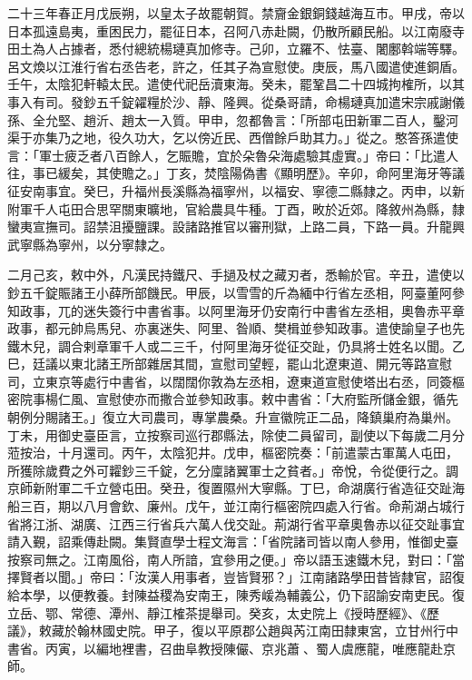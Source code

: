 
\begin{pinyinscope}

 二十三年春正月戊辰朔，以皇太子故罷朝賀。禁齎金銀銅錢越海互市。甲戌，帝以日本孤遠島夷，重困民力，罷征日本，召阿八赤赴闕，仍散所顧民船。以江南廢寺田土為人占據者，悉付總統楊璉真加修寺。己卯，立羅不、怯臺、闍鄽斡端等驛。呂文煥以江淮行省右丞告老，許之，任其子為宣慰使。庚辰，馬八國遣使進銅盾。壬午，太陰犯軒轅太民。遣使代祀岳瀆東海。癸未，罷鞏昌二十四城拘榷所，以其事入有司。發鈔五千錠糴糧於沙、靜、隆興。從桑哥請，命楊璉真加遣宋宗戚謝儀孫、全允堅、趙沂、趙太一入質。甲申，忽都魯言：「所部屯田新軍二百人，鑿河渠于亦集乃之地，役久功大，乞以傍近民、西僧餘戶助其力。」從之。憨答孫遣使言：「軍士疲乏者八百餘人，乞賑贍，宜於朵魯朵海處驗其虛實。」帝曰：「比遣人往，事已緩矣，其使贍之。」丁亥，焚陰陽偽書《顯明歷》。辛卯，命阿里海牙等議征安南事宜。癸巳，升福州長溪縣為福寧州，以福安、寧德二縣隸之。丙申，以新附軍千人屯田合思罕關東曠地，官給農具牛種。丁酉，畋於近郊。降敘州為縣，隸蠻夷宣撫司。詔禁沮擾鹽課。設諸路推官以審刑獄，上路二員，下路一員。升龍興武寧縣為寧州，以分寧隸之。



 二月己亥，敕中外，凡漢民持鐵尺、手撾及杖之藏刃者，悉輸於官。辛丑，遣使以鈔五千錠賑諸王小薛所部饑民。甲辰，以雪雪的斤為緬中行省左丞相，阿臺董阿參知政事，兀的迷失簽行中書省事。以阿里海牙仍安南行中書省左丞相，奧魯赤平章政事，都元帥烏馬兒、亦裏迷失、阿里、昝順、樊楫並參知政事。遣使諭皇子也先鐵木兒，調合剌章軍千人或二三千，付阿里海牙從征交趾，仍具將士姓名以聞。乙巳，廷議以東北諸王所部雜居其間，宣慰司望輕，罷山北遼東道、開元等路宣慰司，立東京等處行中書省，以闊闊你敦為左丞相，遼東道宣慰使塔出右丞，同簽樞密院事楊仁風、宣慰使亦而撒合並參知政事。敕中書省：「大府監所儲金銀，循先朝例分賜諸王。」復立大司農司，專掌農桑。升宣徽院正二品，降鎮巢府為巢州。丁未，用御史臺臣言，立按察司巡行郡縣法，除使二員留司，副使以下每歲二月分蒞按治，十月還司。丙午，太陰犯井。戊申，樞密院奏：「前遣蒙古軍萬人屯田，所獲除歲費之外可糶鈔三千錠，乞分廩諸翼軍士之貧者。」帝悅，令從便行之。調京師新附軍二千立營屯田。癸丑，復置隰州大寧縣。丁巳，命湖廣行省造征交趾海船三百，期以八月會欽、廉州。戊午，並江南行樞密院四處入行省。命荊湖占城行省將江浙、湖廣、江西三行省兵六萬人伐交趾。荊湖行省平章奧魯赤以征交趾事宜請入覲，詔乘傳赴闕。集賢直學士程文海言：「省院諸司皆以南人參用，惟御史臺按察司無之。江南風俗，南人所諳，宜參用之便。」帝以語玉速鐵木兒，對曰：「當擇賢者以聞。」帝曰：「汝漢人用事者，豈皆賢邪？」江南諸路學田昔皆隸官，詔復給本學，以便教養。封陳益稷為安南王，陳秀嵈為輔義公，仍下詔諭安南吏民。復立岳、鄂、常德、潭州、靜江榷茶提舉司。癸亥，太史院上《授時歷經》、《歷議》，敕藏於翰林國史院。甲子，復以平原郡公趙與芮江南田隸東宮，立甘州行中書省。丙寅，以編地裡書，召曲阜教授陳儼、京兆蕭、蜀人虞應龍，唯應龍赴京師。




\end{pinyinscope}
